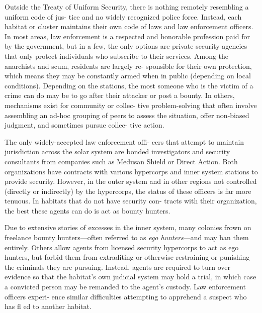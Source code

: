 Outside the Treaty of Uniform Security, there is 
nothing remotely resembling a uniform code of jus-
tice and no widely recognized police force. Instead, 
each habitat or cluster maintains their own code of 
laws and law enforcement officers. In most areas, law 
enforcement is a respected and honorable profession 
paid for by the government, but in a few, the only 
options are private security agencies that only protect 
individuals who subscribe to their services. Among 
the anarchists and scum, residents are largely re-
sponsible for their own protection, which means they 
may be constantly armed when in public (depending 
on local conditions). Depending on the stations, the 
most someone who is the victim of a crime can do 
may be to go after their attacker or post a bounty. 
In others, mechanisms exist for community or collec-
tive problem-solving that often involve assembling an 
ad-hoc grouping of peers to assess the situation, offer 
non-biased judgment, and sometimes pursue collec-
tive action.

The only widely-accepted law enforcement offi-
cers that attempt to maintain jurisdiction across the 
solar system are bonded investigators and security 
consultants from companies such as Medusan Shield 
or Direct Action. Both organizations have contracts 
with various hypercorps and inner system stations to 
provide security. However, in the outer system and in 
other regions not controlled (directly or indirectly) by 
the hypercorps, the status of these officers is far more 
tenuous. In habitats that do not have security con-
tracts with their organization, the best these agents 
can do is act as bounty hunters.

Due to extensive stories of excesses in the inner 
system, many colonies frown on freelance bounty 
hunters—often referred to as \textit{ego hunters}—and may 
ban them entirely. Others allow agents from licensed 
security hypercorps to act as ego hunters, but forbid 
them from extraditing or otherwise restraining or 
punishing the criminals they are pursuing. Instead, 
agents are required to turn over evidence so that the 
habitat's own judicial system may hold a trial, in 
which case a convicted person may be remanded to 
the agent's custody. Law enforcement officers experi-
ence similar difficulties attempting to apprehend a 
suspect who has fl ed to another habitat.

